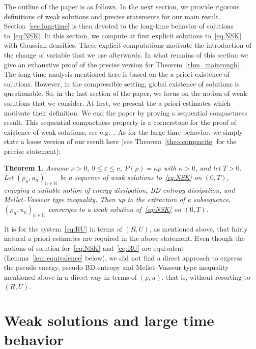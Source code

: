 \documentclass[10pt]{amsart}
\newtheorem{theo}{Theorem}[section]
\theoremstyle{definition}\newtheorem{defi}[theo]{Definition}\newtheorem{rema}[theo]{Remark}\newtheorem{exam}[theo]{Example}\newtheorem{exem}[theo]{Example}\newtheorem{nota}[theo]{Notation}
\newcommand*\N{\mathbb{N}}
\newcommand*\<{\left\langle}
\renewcommand*\>{\right\rangle}
\renewcommand*\le{\leqslant}
\newcommand*\eps{\varepsilon}
\begin{document}
The outline of the paper is as follows. In the next section, we provide rigorous definitions of weak solutions and precise statements for our main result. Section~\ref{sec:longtime} is then devoted to the long-time behavior of solutions to~\eqref{eq:NSK}. In this section, we compute at first explicit solutions to~\eqref{eq:NSK} with Gaussian densities. These explicit computations motivate the introduction of the change of variable that we use afterwards. In what remains of this section we give an exhaustive proof of the precise version for Theorem~\ref{thm_mainrough}. The long-time analysis mentioned here is based on the a priori existence of solutions. However, in the compressible setting, global existence of solutions is questionable. So, in the last section of the paper, we focus on the notion of weak solutions that we consider. At first, we present the a priori estimates which motivate their definition. We end the paper by proving a sequential compactness result. This sequential compactness property is a cornerstone for the proof of existence of weak solutions, see e.g.~\cite{Lio98,Fei04}. As for the large time behavior, we simply state a loose version of our result here (see Theorem~\ref{theo:compacite} for the precise statement):
\begin{theo}
Assume $\nu >0$, $0\le \eps \le \nu$, $P(\rho)=\kappa \rho$ with $\kappa>0$, and let $T>0$. Let $(\rho_n,u_n)_{n\in \N}$ be a sequence of weak solutions to~\eqref{eq:NSK} on $(0,T)$, enjoying a suitable notion of energy dissipation, BD-entropy dissipation, and Mellet--Vasseur type inequality. Then up to the extraction of a subsequence, $(\rho_n,u_n)_{n\in \N}$ converges to a weak solution of~\eqref{eq:NSK} on $(0,T)$.
\end{theo}

It is for the system~\eqref{eq:RU} in terms of $(R,U)$, as mentioned above, that fairly natural a priori estimates are required in the above statement. Even though the notions of solution for~\eqref{eq:NSK} and~\eqref{eq:RU} are equivalent (Lemma~\ref{lem:equivalence} below), we did not find a direct approach to express the pseudo energy, pseudo BD-entropy and Mellet--Vasseur type inequality mentioned above in a direct way in terms of $(\rho,u)$, that is, without resorting to $(R,U)$.



\section{Weak solutions and large time behavior}\label{sec:main}
\end{document}
